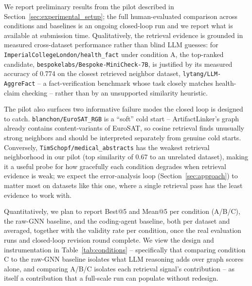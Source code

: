 
We report preliminary results from the pilot described in Section~\ref{sec:experimental_setup}; the full human-evaluated comparison across conditions and baselines is an ongoing closed-loop run and we report what is available at submission time. Qualitatively, the retrieval evidence is grounded in measured cross-dataset performance rather than blind LLM guesses: for \texttt{ImperialCollegeLondon/health\_fact} under condition A, the top-ranked candidate, \texttt{bespokelabs/Bespoke-MiniCheck-7B}, is justified by its measured accuracy of 0.774 on the closest retrieved neighbor dataset, \texttt{lytang/LLM-AggreFact} -- a fact-verification benchmark whose task closely matches health-claim checking -- rather than by an unsupported similarity heuristic.

The pilot also surfaces two informative failure modes the closed loop is designed to catch. \texttt{blanchon/EuroSAT\_RGB} is a ``soft'' cold start -- ArtifactLinker's graph already contains content-variants of EuroSAT, so cosine retrieval finds unusually strong neighbors and should be interpreted separately from genuine cold starts. Conversely, \texttt{TimSchopf/medical\_abstracts} has the weakest retrieval neighborhood in our pilot (top similarity of 0.67 to an unrelated dataset), making it a useful probe for how gracefully each condition degrades when retrieval evidence is weak; we expect the error-analysis loop (Section~\ref{sec:approach}) to matter most on datasets like this one, where a single retrieval pass has the least evidence to work with.

Quantitatively, we plan to report Best@5 and Mean@5 per condition (A/B/C), the raw-GNN baseline, and the coding-agent baseline, both per dataset and averaged, together with the validity rate per condition, once the real evaluation runs and closed-loop revision round complete. We view the design and instrumentation in Table~\ref{tab:conditions} -- specifically that comparing condition C to the raw-GNN baseline isolates what LLM reasoning adds over graph scores alone, and comparing A/B/C isolates each retrieval signal's contribution -- as itself a contribution that a full-scale run can populate without redesign.